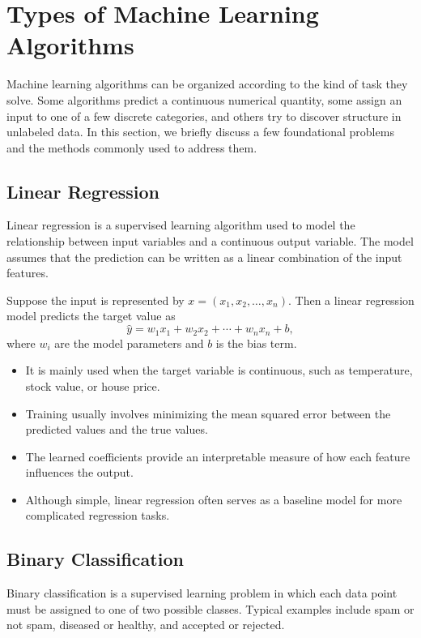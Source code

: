 \documentclass[english,12pt,a4paper]{report}
\begin{document}
	\section{Types of Machine Learning Algorithms}
	Machine learning algorithms can be organized according to the kind of task they solve. Some algorithms predict a continuous numerical quantity, some assign an input to one of a few discrete categories, and others try to discover structure in unlabeled data. In this section, we briefly discuss a few foundational problems and the methods commonly used to address them. \cite{Djordjevic2021}
	
	\subsection{Linear Regression}
     Linear regression is a supervised learning algorithm used to model the relationship between input variables and a continuous output variable. The model assumes that the prediction can be written as a linear combination of the input features.
	
	Suppose the input is represented by $x=(x_1,x_2,\dots,x_n)$. Then a linear regression model predicts the target value as
	\begin{equation}
		\hat{y} = w_1x_1 + w_2x_2 + \cdots + w_nx_n + b,
	\end{equation}
	where $w_i$ are the model parameters and $b$ is the bias term.
	

	\begin{itemize}
		\item It is mainly used when the target variable is continuous, such as temperature, stock value, or house price.
		\item Training usually involves minimizing the mean squared error between the predicted values and the true values.
		\item The learned coefficients provide an interpretable measure of how each feature influences the output.
		\item Although simple, linear regression often serves as a baseline model for more complicated regression tasks.
	\end{itemize}
	
	\subsection{Binary Classification}
	Binary classification is a supervised learning problem in which each data point must be assigned to one of two possible classes. Typical examples include spam or not spam, diseased or healthy, and accepted or rejected.
	
\end{document}

